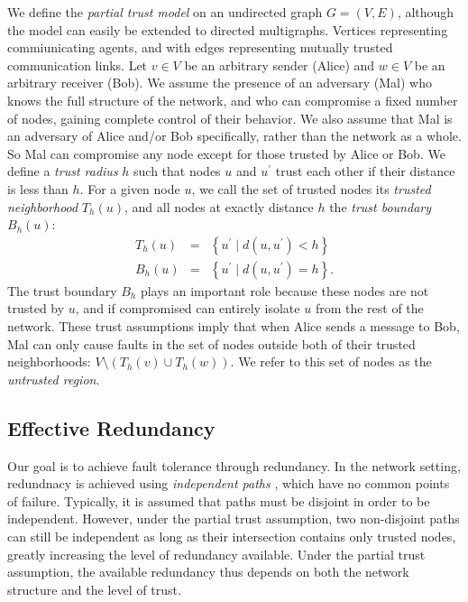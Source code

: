 \documentclass{sig-alternate-05-2015}
\newcommand{\beq}{\begin{eqnarray}}
\newcommand{\eeq}{\end{eqnarray}}
\begin{document}
We define the {\em partial trust model} on
an undirected graph $G = (V,E)$,
although the model can easily be extended to directed multigraphs.
Vertices representing commiunicating agents,
and with edges representing mutually trusted communication links.
Let $v \in V$ be an arbitrary sender (Alice)
and $w \in V$ be an arbitrary receiver (Bob).
We assume the presence of an adversary (Mal) who knows the
full structure of the network,
and who can compromise a fixed number of nodes,
gaining complete control of their behavior.
We also assume that Mal is an adversary of Alice and/or Bob specifically,
rather than the network as a whole.
So Mal can compromise any node except for those trusted by Alice or Bob.
We define a {\em trust radius} $h$ such that nodes $u$ and
$u^\prime$ trust each other if their distance is less than $h$.
For a given node $u$,
we call the set of trusted nodes its
{\em trusted neighborhood} $T_h(u)$,
and all nodes at exactly distance $h$ the
{\em trust boundary} $B_h(u)$:
\beq
T_h(u) &=& \left\{ u^\prime \mid d(u,u^\prime) < h \right\} \\
B_h(u) &=& \left\{ u^\prime \mid d(u,u^\prime) = h \right\}.
\eeq
The trust boundary $B_h$ plays an important role because these nodes are not
trusted by $u$,
and if compromised can entirely isolate $u$ from the rest of the network.
These trust assumptions imply that when Alice sends a message to Bob,
Mal can only cause faults in the set of nodes outside both of their trusted
neighborhoods: $V \setminus \left(T_h(v) \cup T_h(w)\right)$.
We refer to this set of nodes as the {\em untrusted region}.

\subsection{Effective Redundancy}

Our goal is to achieve fault tolerance through redundancy.
In the network setting, redundnacy is achieved using
{\em independent paths} \cite{reiter_resilient_1998},
which have no common points of failure.
Typically, it is assumed that paths must be disjoint in order to be
independent.
However, under the partial trust assumption, two non-disjoint paths
can still be independent as long as their intersection contains only trusted
nodes,
greatly increasing the level of redundancy available.
Under the partial trust assumption, the available redundancy thus depends on
both the network structure and the level of trust.
\end{document}
